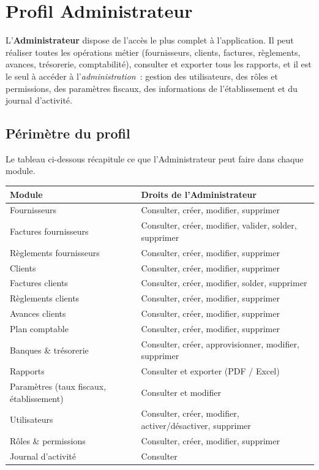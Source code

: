 \chapter{Profil Administrateur}

L'\textbf{Administrateur} dispose de l'accès le plus complet à l'application. Il peut réaliser toutes les opérations métier (fournisseurs, clients, factures, règlements, avances, trésorerie, comptabilité), consulter et exporter tous les rapports, et il est le seul à accéder à l'\emph{administration}~: gestion des utilisateurs, des rôles et permissions, des paramètres fiscaux, des informations de l'établissement et du journal d'activité.

\section{Périmètre du profil}

Le tableau ci-dessous récapitule ce que l'Administrateur peut faire dans chaque module.

\renewcommand{\arraystretch}{1.3}
\begin{longtable}{>{\raggedright\arraybackslash}p{5.4cm} >{\raggedright\arraybackslash}p{9.2cm}}
\toprule
\textbf{Module} & \textbf{Droits de l'Administrateur} \\
\midrule
\endhead
Fournisseurs & Consulter, créer, modifier, supprimer \\
Factures fournisseurs & Consulter, créer, modifier, valider, solder, supprimer \\
Règlements fournisseurs & Consulter, créer, modifier, supprimer \\
Clients & Consulter, créer, modifier, supprimer \\
Factures clients & Consulter, créer, modifier, solder, supprimer \\
Règlements clients & Consulter, créer, modifier, supprimer \\
Avances clients & Consulter, créer, modifier, supprimer \\
Plan comptable & Consulter, créer, modifier, supprimer \\
Banques \& trésorerie & Consulter, créer, approvisionner, modifier, supprimer \\
Rapports & Consulter et exporter (PDF / Excel) \\
Paramètres (taux fiscaux, établissement) & Consulter et modifier \\
Utilisateurs & Consulter, créer, modifier, activer/désactiver, supprimer \\
Rôles \& permissions & Consulter, créer, modifier, supprimer \\
Journal d'activité & Consulter \\
\bottomrule
\end{longtable}
\renewcommand{\arraystretch}{1}

